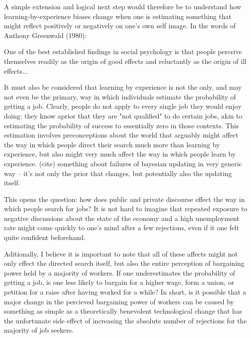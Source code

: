 \documentclass[a4paper,12pt]{article}
\begin{document}
A simple extension and logical next step would therefore be to understand how learning-by-experience biases change when one is estimating something that might reflect positively or negatively on one's own self image. In the words of Anthony Greenwald (1980):

\begin{displayquote}
One of the best established findings in social psychology is that people perceive themselves readily as the origin of good effects and reluctantly as the origin of ill effects...
\end{displayquote}

It must also be considered that learning by experience is not the only, and may not even be the primary, way in which individuals estimate the probability of getting a job. Clearly, people do not apply to every single job they would enjoy doing: they know aprior that they are "not qualified" to do certain jobs, akin to estimating the probability of success to essentially zero in those contexts. This estimation involves preconceptions about the world that arguably might affect the way in which people direct their search much more than learning by experience, but also might very much affect the way in which people learn by experience. (cite) something about failures of bayesian updating in very generic way -- it's not only the prior that changes, but potentially also the updating itself.

This opens the question: how does public and private discourse effect the way in which people search for jobs? It is not hard to imagine that repeated exposure to negative discussions about the state of the economy and a high unemployment rate might come quickly to one's mind after a few rejections, even if it one felt quite confident beforehand.

Aditionally, I believe it is important to note that all of these affects might not only effect the directed search itself, but also the entire perception of bargaining power held by a majority of workers. If one underestimates the probability of getting a job, is one less likely to bargain for a higher wage, form a union, or petition for a raise after having worked for a while? In short, is it possible that a major change in the percieved bargaining power of workers can be caused by something as simple as a theoretically benevolent technological change that has the unfortunate side effect of increasing the absolute number of rejections for the majority of job seekers.
\end{document}
